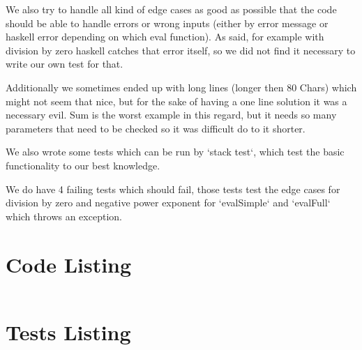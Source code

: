 \documentclass[12pt,a4paper]{article}
\begin{document}
We also try to handle all kind of edge cases as good as possible that the code should be able to handle errors or wrong inputs (either by error message or haskell error depending on which eval function). As said, for example with division by zero haskell catches that error itself, so we did not find it necessary to write our own test for that.

Additionally we sometimes ended up with long lines (longer then 80 Chars) which might not seem that nice, but for the sake of having a one line solution it was a necessary evil. Sum is the worst example in this regard, but it needs so many parameters that need to be checked so it was difficult do to it shorter.


We also wrote some tests which can be run by `stack test`, which test the basic functionality to our best knowledge.

We do have 4 failing tests which should fail, those tests test the edge cases for division by zero and negative power exponent for `evalSimple` and `evalFull` which throws an exception.

\appendix
\section{Code Listing}

\inputminted{haskell}{arithmetic/src/Arithmetic.hs}

\section{Tests Listing}

\inputminted{haskell}{arithmetic/test/Spec.hs}
\end{document}
